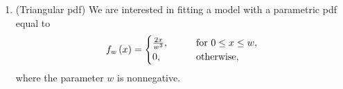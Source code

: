 \documentclass[12pt,twoside]{article}
\begin{document}
\begin{enumerate}
\item (Triangular pdf)
We are interested in fitting a model with a parametric pdf equal to
\begin{align}
f_{w}\left( x \right)  = \begin{cases}
 \frac{2x}{w^2}, \qquad & \text{for } 0 \leq x \leq w,\\
0, \qquad & \text{otherwise},
\end{cases}
\end{align}
where the parameter $w$ is nonnegative. 


\end{enumerate}
\end{document}
